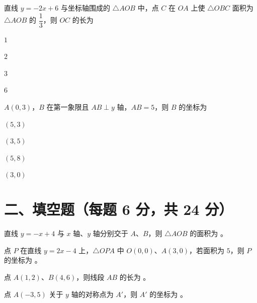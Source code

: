 \documentclass{exam-zh}
\begin{document}
\begin{question}[points=6]
  直线 $y=-2x+6$ 与坐标轴围成的 $\triangle AOB$ 中，点 $C$ 在 $OA$ 上使 $\triangle OBC$ 面积为 $\triangle AOB$ 的 $\dfrac{1}{3}$，则 $OC$ 的长为
  \begin{choices}
    \item $1$
    \item $2$
    \item $3$
    \item $6$
  \end{choices}
\end{question}



\begin{question}[points=6]
  $A(0,3)$，$B$ 在第一象限且 $AB \perp y$ 轴，$AB=5$，则 $B$ 的坐标为
  \begin{choices}
    \item $(5, 3)$
    \item $(3, 5)$
    \item $(5, 8)$
    \item $(3, 0)$
  \end{choices}
\end{question}


\section*{二、填空题（每题 6 分，共 24 分）}



\begin{question}[points=6]
  直线 $y=-x+4$ 与 $x$ 轴、$y$ 轴分别交于 $A$、$B$，则 $\triangle AOB$ 的面积为 \fillin。
  \fillin
\end{question}



\begin{question}[points=6]
  点 $P$ 在直线 $y=2x-4$ 上，$\triangle OPA$ 中 $O(0,0)$、$A(3,0)$，若面积为 $5$，则 $P$ 的坐标为 \fillin。
  \fillin
\end{question}



\begin{question}[points=6]
  点 $A(1,2)$、$B(4,6)$，则线段 $AB$ 的长为 \fillin。
  \fillin
\end{question}



\begin{question}[points=6]
  点 $A(-3,5)$ 关于 $y$ 轴的对称点为 $A'$，则 $A'$ 的坐标为 \fillin。
  \fillin
\end{question}
\end{document}

